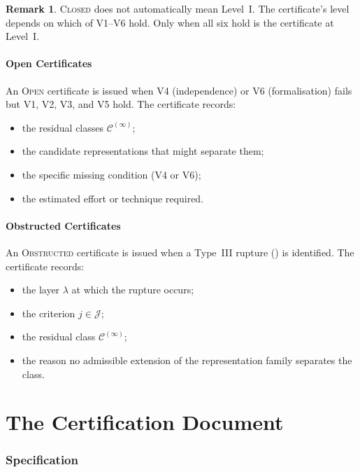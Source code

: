 \documentclass[11pt,a4paper]{article}
\theoremstyle{definition}
\newtheorem{remark}[definition]{Remark}
\theoremstyle{plain}
\newcommand{\Ccal}{\mathcal{C}}
\newcommand{\Jset}{\mathcal{J}}
\newcommand{\STOPEN}{\textsc{Open}}
\newcommand{\STOBSTR}{\textsc{Obstructed}}
\begin{document}
\begin{remark}
\textsc{Closed} does not automatically mean Level~I. The
certificate's level depends on which of V1--V6 hold. Only when all
six hold is the certificate at Level~I.
\end{remark}

\subsection{Open Certificates}

An \STOPEN{} certificate is issued when V4 (independence) or V6
(formalisation) fails but V1, V2, V3, and V5 hold. The certificate
records:
\begin{itemize}
  \item the residual classes $\Ccal^{(\infty)}$;
  \item the candidate representations that might separate them;
  \item the specific missing condition (V4 or V6);
  \item the estimated effort or technique required.
\end{itemize}

\subsection{Obstructed Certificates}

An \STOBSTR{} certificate is issued when a Type~III rupture
(\cite[Definition 3.6]{paperII}) is identified. The certificate
records:
\begin{itemize}
  \item the layer $\lambda$ at which the rupture occurs;
  \item the criterion $j \in \Jset$;
  \item the residual class $\Ccal^{(\infty)}$;
  \item the reason no admissible extension of the representation
        family separates the class.
\end{itemize}

\part{The Certification Document}
\label{part:certificate}

\section{Specification}
\label{sec:certificate}
\end{document}
